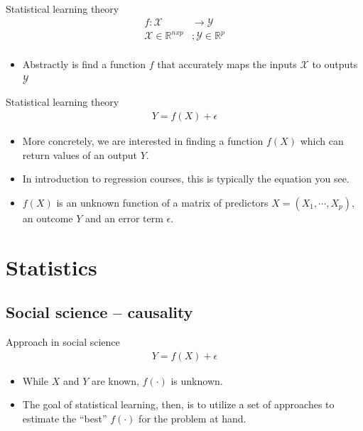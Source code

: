 \documentclass{beamer}
\begin{document}
\begin{frame}{Statistical learning theory} %
\begin{align*}
	f: \mathcal{X} &\rightarrow \mathcal{Y} \\
	 \mathcal{X} \in \mathbb{R}^{nxp} & ; \mathcal{Y}  \in \mathbb{R}^{p} \\
\end{align*}

 \begin{itemize}
 	\item Abstractly is find a function $f$ that accurately maps the inputs $\mathcal{X}$ to outputs $\mathcal{Y}$
 	
 \end{itemize}
\end{frame}

\begin{frame}{Statistical learning theory} %
\begin{align*}
	 Y = f(X) + \epsilon
\end{align*}

 \begin{itemize}
 	\item More concretely, we are interested in finding a function $f(X)$ which can return values of an output $Y$.
 	\item In introduction to regression courses, this is typically the equation you see.
    \item $f(X)$ is an unknown function of a matrix of predictors $X = (X_{1},\cdots, X_{p})$, an outcome $Y$ and an error term $\epsilon$.
 \end{itemize}
\end{frame}


\section*{Statistics}

\subsection*{Social science -- causality}

\begin{frame}{Approach in social science} %
\begin{align*}
	 Y = f(X) + \epsilon
\end{align*}

 \begin{itemize}
 	\item While $X$ and $Y$ are known, $f(\cdot)$ is unknown.
 	\item The goal of statistical learning, then, is to utilize a set of approaches to estimate the ``best'' $f(\cdot)$ for the problem at hand.
 \end{itemize}
\end{frame}
\end{document}
